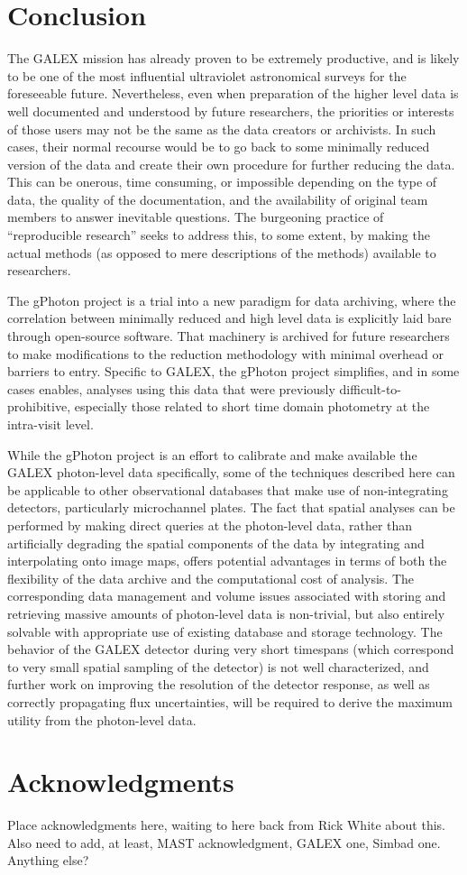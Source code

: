 \documentclass[5p]{elsarticle}
\begin{document}
\section{Conclusion}

The GALEX mission has already proven to be extremely productive, and is likely to be one of the most influential ultraviolet astronomical surveys for the foreseeable future.  Nevertheless, even when preparation of the higher level data is well documented and understood by future researchers, the priorities or interests of those users may not be the same as the data creators or archivists. In such cases, their normal recourse would be to go back to some minimally reduced version of the data and create their own procedure for further reducing the data. This can be onerous, time consuming, or impossible depending on the type of data, the quality of the documentation, and the availability of original team members to answer inevitable questions. The burgeoning practice of ``reproducible research'' seeks to address this, to some extent, by making the actual methods (as opposed to mere descriptions of the methods) available to researchers.

The gPhoton project is a trial into a new paradigm for data archiving, where the correlation between minimally reduced and high level data is explicitly laid bare through open-source software.  That machinery is archived for future researchers to make modifications to the reduction methodology with minimal overhead or barriers to entry.  Specific to GALEX, the gPhoton project simplifies, and in some cases enables, analyses using this data that were previously difficult-to-prohibitive, especially those related to short time domain photometry at the intra-visit level.

While the gPhoton project is an effort to calibrate and make available the GALEX photon-level data specifically, some of the techniques described here can be applicable to other observational databases that make use of non-integrating detectors, particularly microchannel plates. The fact that spatial analyses can be performed by making direct queries at the photon-level data, rather than artificially degrading the spatial components of the data by integrating and interpolating onto image maps, offers potential advantages in terms of both the flexibility of the data archive and the computational cost of analysis. The corresponding data management and volume issues associated with storing and retrieving massive amounts of photon-level data is non-trivial, but also entirely solvable with appropriate use of existing database and storage technology. The behavior of the GALEX detector during very short timespans (which correspond to very small spatial sampling of the detector) is not well characterized, and further work on improving the resolution of the detector response, as well as correctly propagating flux uncertainties, will be required to derive the maximum utility from the photon-level data.

\section{Acknowledgments}
{\color{red}Place acknowledgments here, waiting to here back from Rick White about this.  Also need to add, at least, MAST acknowledgment, GALEX one, Simbad one.  Anything else?}


\end{document}
